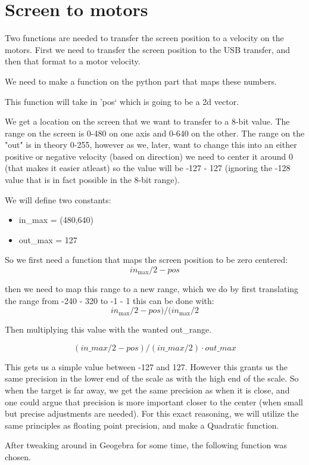 \section{Screen to motors}
Two functions are needed to transfer the screen position to a velocity on the motors.
First we need to transfer the screen position to the USB transfer, and then that format to a motor velocity.

We need to make a function on the python part that maps these numbers.

This function will take in 'pos` which is going to be a 2d vector.

We get a location on the screen that we want to transfer to a 8-bit value. 
The range on the screen is 0-480 on one axis and 0-640 on the other.
The range on the "out" is in theory 0-255, however as we, later, want to change this into an either positive or negative velocity (based on direction) we need to center it around 0 (that makes it easier atleast) so the value will be -127 - 127 (ignoring the -128 value that is in fact possible in the 8-bit range).


We will define two constants:
\begin{itemize}
\item in\_max = (480,640)
\item out\_max = 127
\end{itemize}

So we first need a function that maps the screen position to be zero centered: 
$$
in_\text{max}/2 - pos
$$

then we need to map this range to a new range, which we do by first translating the range from -240 - 320 to -1 - 1
this can be done with:
$$
in_\text{max}/2 - pos)/(in_\text{max}/2
$$


Then multiplying this value with the wanted out\_range.

$$
(in\_max/2 - pos)/(in\_max/2) \cdot out\_max
$$

This gets us a simple value between -127 and 127. However this grants us the same precision in the lower end of the scale as with the high end of the scale.
So when the target is far away, we get the same precision as when it is close, and one could argue that precision is more important closer to the center (when small but precise adjustments are needed).
For this exact reasoning, we will utilize the same principles as floating point precision, and make a Quadratic function. 

After tweaking around in Geogebra for some time, the following function was chosen.

